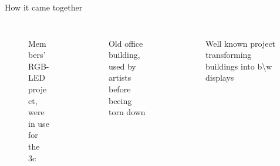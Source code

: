 \documentclass{beamer}
\begin{document}
\begin{frame}{How it came together}
\begin{columns}
\begin{column}{3.5cm}
\begin{figure}
\begin{center}
          \end{center}
        \end{figure}
\end{column}
\end{columns}
\begin{columns}[T]
\begin{column}{3.5cm}
        \begin{figure}
          \begin{center}
          Members' RGB-LED project, \\were in use for the 3c
          \end{center}
        \end{figure}

\end{column}
\begin{column}{3.5cm}
        \begin{figure}
          \begin{center}
          Old office building,\\used by artists before beeing torn down
          \end{center}
        \end{figure}

\end{column}
\begin{column}{3.5cm}
        \begin{figure}
          \begin{center}
          Well known project transforming buildings into b\textbackslash w displays
          \end{center}
        \end{figure}

    \end{column}
\end{columns}
\end{frame}
\end{document}
